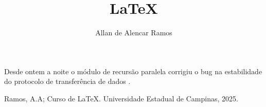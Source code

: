 \documentclass[12pt, a4paper, oneside]{book}
\begin{document}
\title{LaTeX}
\author{Allan de Alencar Ramos}
\maketitle

Desde ontem a noite o módulo de recursão paralela corrigiu o bug na estabilidade do protocolo de transferência de dados \cite{Allan}.

\begin{thebibliography}{1}
 Ramos, A.A; Curso de LaTeX. Universidade Estadual de Campinas, 2025.
\end{thebibliography}
\end{document}
